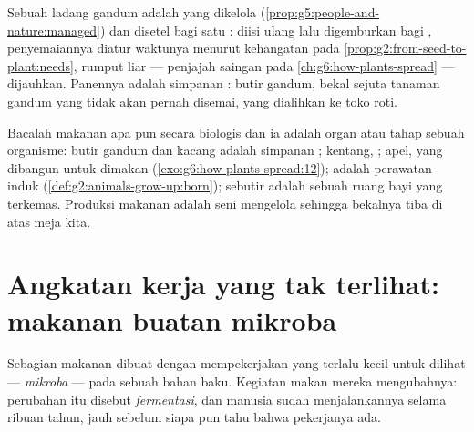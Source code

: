 \begin{example}\label{ex:g6:producing-our-food:wheat}
Sebuah ladang gandum adalah  yang dikelola
(\cref{prop:g5:people-and-nature:managed}) dan disetel bagi satu
:  diisi ulang lalu digemburkan bagi ,
penyemaiannya diatur waktunya menurut kehangatan pada
\cref{prop:g2:from-seed-to-plant:needs}, rumput liar --- penjajah
saingan pada \cref{ch:g6:how-plants-spread} --- dijauhkan. Panennya
adalah simpanan  : butir gandum, bekal sejuta tanaman
gandum yang tidak akan pernah disemai, yang dialihkan ke toko roti.
\end{example}

\begin{remark}\label{rem:g6:producing-our-food:stage}
Bacalah makanan apa pun secara biologis dan ia adalah organ atau tahap
sebuah organisme: butir gandum dan kacang adalah simpanan ;
kentang, ; apel,  yang dibangun untuk dimakan
(\cref{exo:g6:how-plants-spread:12});  adalah perawatan induk
 (\cref{def:g2:animals-grow-up:born}); sebutir  adalah
sebuah ruang bayi yang terkemas. Produksi makanan adalah seni
mengelola  sehingga bekalnya tiba di atas meja kita.
\end{remark}

\section{Angkatan kerja yang tak terlihat: makanan buatan mikroba}

\begin{definition}[Fermentasi]\label{def:g6:producing-our-food:fermentation}
Sebagian makanan dibuat dengan mempekerjakan  yang
terlalu kecil untuk dilihat --- \emph{mikroba}
--- pada sebuah bahan baku. Kegiatan makan mereka mengubahnya:
perubahan itu disebut
\emph{fermentasi}, dan manusia sudah menjalankannya
selama ribuan tahun, jauh sebelum siapa pun tahu bahwa pekerjanya ada.
\end{definition}


